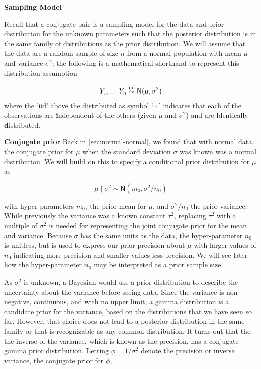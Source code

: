 \documentclass[]{book}
\theoremstyle{definition}
\theoremstyle{definition}
\theoremstyle{definition}
\theoremstyle{remark}
\begin{document}
\textbf{Sampling Model}

Recall that a conjugate pair is a sampling model for the data and prior
distribution for the unknown parameters such that the posterior
distribution is in the same family of distributions as the prior
distribution. We will assume that the data are a random sample of size
\(n\) from a normal population with mean \(\mu\) and variance
\(\sigma^2\); the following is a mathematical shorthand to represent
this distribution assumption

\[\begin{aligned}
Y_1, \ldots Y_n  \mathrel{\mathop{\sim}\limits^{\rm iid}}
\textsf{N}(\mu, \sigma^2) 
\end{aligned}\] where the `iid' above the distributed as symbol
`\(\sim\)' indicates that each of the observations are
\textbf{i}ndependent of the others (given \(\mu\) and \(\sigma^2\)) and
are \textbf{i}dentically \textbf{d}istributed.

\textbf{Conjugate prior} Back in \ref{sec:normal-normal}, we found that
with normal data, the conjugate prior for \(\mu\) when the standard
deviation \(\sigma\) was known was a normal distribution. We will build
on this to specify a conditional prior distribution for \(\mu\) as

\begin{equation}
\mu \mid \sigma^2   \sim  \textsf{N}(m_0, \sigma^2/n_0)
\label{eq:04-conjugate-normal}
\end{equation}

with hyper-parameters \(m_0\), the prior mean for \(\mu\), and
\(\sigma^2/n_0\) the prior variance. While previously the variance was a
known constant \(\tau^2\), replacing \(\tau^2\) with a multiple of
\(\sigma^2\) is needed for representing the joint conjugate prior for
the mean and variance. Because \(\sigma\) has the same units as the
data, the hyper-parameter \(n_0\) is unitless, but is used to express
our prior precision about \(\mu\) with larger values of \(n_0\)
indicating more precision and smaller values less precision. We will see
later how the hyper-parameter \(n_0\) may be interpreted as a prior
sample size.

As \(\sigma^2\) is unknown, a Bayesian would use a prior distribution to
describe the uncertainty about the variance before seeing data. Since
the variance is non-negative, continuous, and with no upper limit, a
gamma distribution is a candidate prior for the variance, based on the
distributions that we have seen so far. However, that choice does not
lead to a posterior distribution in the same family or that is
recognizable as any common distribution. It turns out that the the
inverse of the variance, which is known as the precision, has a
conjugate gamma prior distribution. Letting \(\phi = 1/\sigma^2\) denote
the precision or inverse variance, the conjugate prior for \(\phi\),
\end{document}
